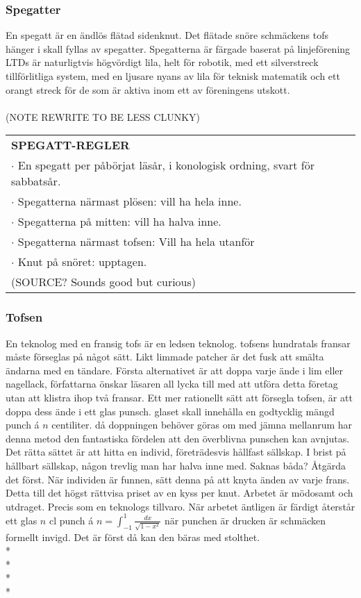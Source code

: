 \subsubsection*{\textbf{Spegatter}}
En spegatt är en ändlös flätad sidenknut. Det flätade snöre schmäckens tofs hänger i skall fyllas av spegatter.
Spegatterna är färgade baserat på linjeförening LTDs är naturligtvis högvördigt lila, helt för robotik, med ett silverstreck tillförlitliga system,
med en ljusare nyans av lila för teknisk matematik och ett orangt streck för de som är aktiva inom ett av föreningens utskott.\\\\ (NOTE REWRITE TO BE LESS CLUNKY)
\begin{tabular}{p{\textwidth}}
    \textbf{SPEGATT-REGLER} \\
    $\cdot$ En spegatt per påbörjat läsår, i konologisk ordning, svart för sabbatsår.\\
    $\cdot$ Spegatterna närmast plösen: vill ha hela inne.\\
    $\cdot$ Spegatterna på mitten: vill ha halva inne.\\
    $\cdot$ Spegatterna närmast tofsen: Vill ha hela utanför \\
    $\cdot$ Knut på snöret: upptagen.\\ (SOURCE? Sounds good but curious)
\end{tabular}

\subsubsection*{\textbf{Tofsen}}
En teknolog med en fransig tofs är en ledsen teknolog. tofsens hundratals fransar måste förseglas på något sätt. Likt limmade patcher är det fusk att smälta
ändarna med en tändare. Första alternativet är att doppa varje ände i lim eller nagellack, författarna önskar läsaren all lycka till med att utföra detta
företag utan att klistra ihop två fransar. Ett mer rationellt sätt att försegla tofsen, är att doppa dess ände i ett glas punsch. glaset skall innehålla 
en godtycklig mängd punch á $n$ centiliter. då doppningen behöver göras om med jämna mellanrum har denna metod den fantastiska fördelen att den överblivna 
punschen kan avnjutas. Det rätta sättet är att hitta en individ, företrädesvis hållfast sällskap. I brist på hållbart sällskap, någon trevlig man har halva inne med.
Saknas båda? Åtgärda det först. När individen är funnen, sätt denna på att knyta änden av varje frans. Detta till det högst rättvisa priset av en kyss per knut.
Arbetet är mödosamt och utdraget. Precis som en teknologs tillvaro. När arbetet äntligen är färdigt återstår ett glas $n$ cl punch á $n =\int_{-1}^{1} \frac{dx}{\sqrt{1-x^2}}$
när punchen är drucken är schmäcken formellt invigd. Det är först då kan den bäras med stolthet.\\*\\*
\\*
\\*

\newpage
